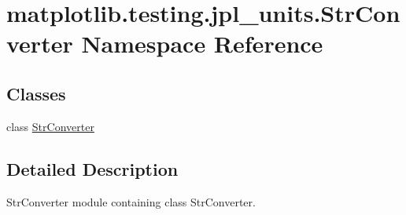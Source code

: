 \hypertarget{namespacematplotlib_1_1testing_1_1jpl__units_1_1StrConverter}{}\section{matplotlib.\+testing.\+jpl\+\_\+units.\+Str\+Converter Namespace Reference}
\label{namespacematplotlib_1_1testing_1_1jpl__units_1_1StrConverter}
\subsection*{Classes}
\begin{DoxyCompactItemize}
\item 
class \hyperlink{classmatplotlib_1_1testing_1_1jpl__units_1_1StrConverter_1_1StrConverter}{Str\+Converter}
\end{DoxyCompactItemize}


\subsection{Detailed Description}
\begin{DoxyVerb}StrConverter module containing class StrConverter.\end{DoxyVerb}
 